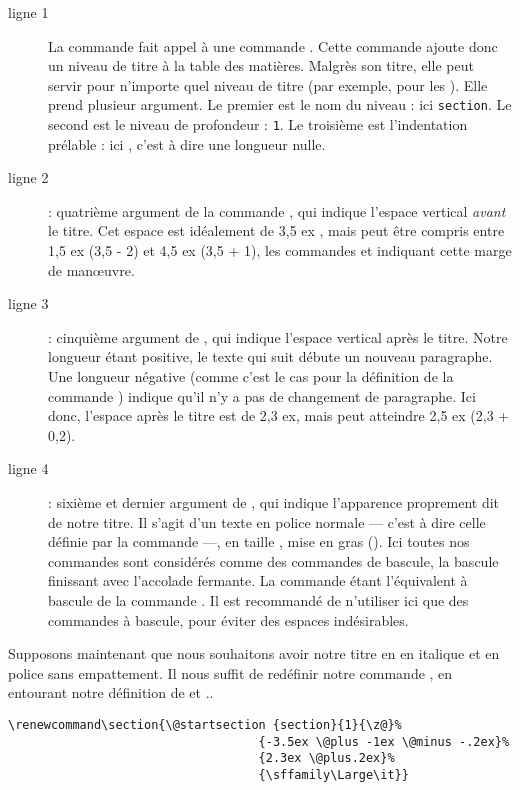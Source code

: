 \begin{description}
\item[ligne 1]La commande  fait appel à une commande . Cette commande ajoute donc un niveau de titre à la table des matières. Malgrès son titre, elle peut servir pour n'importe quel niveau de titre (par exemple, pour les ). Elle prend plusieur argument. Le premier est le nom du niveau : ici \verb|section|. Le second est le niveau de profondeur : \verb|1|. Le troisième est l'indentation prélable : ici , c'est à dire une longueur nulle.
\item[ligne 2]: quatrième argument de la commande , qui indique l'espace vertical \emph{avant} le titre. Cet espace est idéalement de 3,5 ex , mais peut être compris entre 1,5 ex (3,5 - 2) et 4,5 ex (3,5 + 1), les commandes  et  indiquant cette marge de manœuvre.
\item[ligne 3]: cinquième argument de , qui indique l'espace vertical après le titre. Notre longueur étant positive, le texte qui suit débute un nouveau paragraphe. Une longueur négative (comme c'est le cas pour la définition de la commande ) indique qu'il n'y a pas de changement de paragraphe. Ici donc, l'espace après le titre est de 2,3 ex, mais peut atteindre 2,5 ex (2,3 + 0,2).
\item[ligne 4]: sixième et dernier argument de , qui indique l'apparence proprement dit de notre titre. Il s'agit d'un texte en police normale --- c'est à dire celle définie par la commande  ---, en taille , mise en gras (). Ici toutes nos commandes sont considérés comme des commandes de bascule, la bascule finissant avec l'accolade fermante. La commande  étant l'équivalent à bascule de la commande . Il est recommandé de n'utiliser ici que des commandes à bascule, pour éviter des espaces indésirables.\label{bfseries}
\end{description}

Supposons maintenant que nous souhaitons avoir notre titre en en italique et en police sans empattement. Il nous suffit de redéfinir notre commande , en entourant notre définition de  et ..

\begin{verbatim}
\renewcommand\section{\@startsection {section}{1}{\z@}%
                                   {-3.5ex \@plus -1ex \@minus -.2ex}%
                                   {2.3ex \@plus.2ex}%
                                   {\sffamily\Large\it}}
\end{verbatim}

